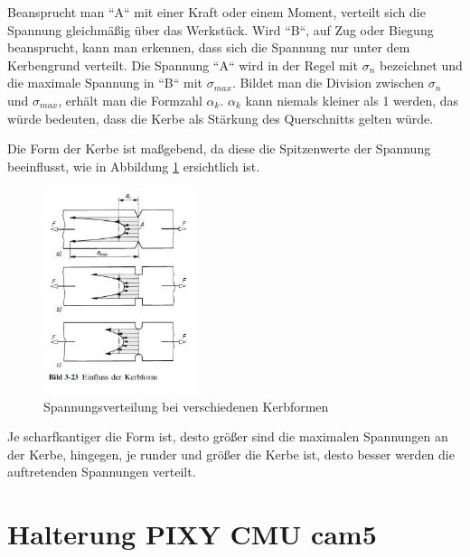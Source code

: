 			\newpage

	Beansprucht man “A“ mit einer Kraft oder einem Moment, verteilt sich die Spannung gleichmäßig über das Werkstück.
	Wird “B“, auf Zug oder Biegung beansprucht, kann man erkennen, dass sich die Spannung nur unter dem Kerbengrund verteilt.
	Die Spannung “A“ wird in der Regel mit $\sigma_{n}$ bezeichnet und die maximale Spannung in “B“ mit $\sigma_{max}$.
	Bildet man die Division zwischen $\sigma_{n}$ und $\sigma_{max}$, erhält man die Formzahl $\alpha_{k}$.
	$\alpha_{k}$ kann niemals kleiner als 1 werden, das würde bedeuten, dass die Kerbe als Stärkung des Querschnitts gelten würde.

	Die Form der Kerbe ist maßgebend, da diese die Spitzenwerte der Spannung beeinflusst, wie in Abbildung \ref{kerbform} ersichtlich ist.

			\begin{figure}[H]
			\begin{centering}
			\includegraphics[width = 0.4\textwidth]{Bilder/kerbform}
			\par\end{centering}
			\caption[Spannungsverteilung bei verschiedenen Kerbformen]{Spannungsverteilung bei verschiedenen Kerbformen\cite{kerbformen}}
			\label{kerbform}
			\end{figure}

	Je scharfkantiger die Form ist, desto größer sind die maximalen Spannungen an der Kerbe, hingegen, je runder und größer die Kerbe ist, desto besser werden die auftretenden Spannungen verteilt.


			\newpage

\section{Halterung PIXY CMU cam5}

